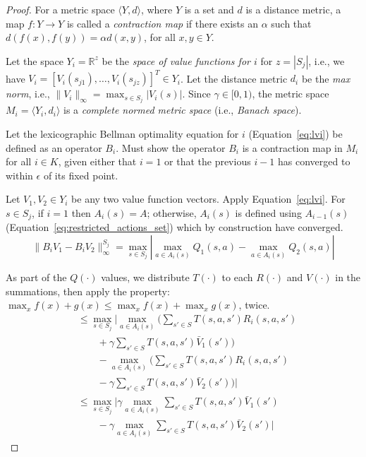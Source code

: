 \begin{proof}
For a metric space $\langle Y, d \rangle$, where $Y$ is a set and $d$ is a distance metric, a map $f : Y \rightarrow Y$ is called a \emph{contraction map} if there exists an $\alpha$ such that $d(f(x), f(y)) = \alpha d(x, y)$, for all $x, y \in Y$.

Let the space $Y_i = \mathbb{R}^z$ be the \emph{space of value functions for $i$} for $z = |S_j|$, i.e., we have $V_i = [V_i(s_{j1}), \ldots, V_i(s_{jz})]^T \in Y_i$. Let the distance metric $d_i$ be the \emph{max norm}, i.e., $\|V_i\|_\infty = \max_{s \in S_j} |V_i(s)|$. Since $\gamma \in [0, 1)$, the metric space $M_i = \langle Y_i, d_i \rangle$ is a \emph{complete normed metric space} (i.e., \emph{Banach space}). %

Let the lexicographic Bellman optimality equation for $i$ (Equation~\ref{eq:lvi}) be defined as an operator $B_i$. Must show the operator $B_i$ is a contraction map in $M_i$ for all $i \in K$, given either that $i=1$ or that the previous $i-1$ has converged to within $\epsilon$ of its fixed point.

Let $V_1, V_2 \in Y_i$ be any two value function vectors. Apply Equation~\ref{eq:lvi}. For $s \in S_j$, if $i = 1$ then $A_i(s) = A$; otherwise, $A_i(s)$ is defined using $A_{i-1}(s)$ (Equation~\ref{eq:restricted_actions_set}) which by construction have converged.
\begin{equation*}
    \| B_i V_1 - B_i V_2 \|_\infty^{S_j} = \max_{s \in S_j} | \max_{a \in A_i(s)} Q_1(s, a) - \max_{a \in A_i(s)} Q_2(s, a) |
\end{equation*}

As part of the $Q(\cdot)$ values, we distribute $T(\cdot)$ to each $R(\cdot)$ and $V(\cdot)$ in the summations, then apply the property: $\max_x f(x) + g(x) \leq \max_x f(x) + \max_x g(x)$, twice.
\begin{align*}
    &\leq \max_{s \in S_j} \Big| \max_{a \in A_i(s)} \Big( \sum_{s' \in S} T(s, a, s') R_i(s, a, s') \\
    &\quad \quad + \gamma \sum_{s' \in S} T(s, a, s') \bar{V}_1(s') \Big) \\
    &\quad \quad - \max_{a \in A_i(s)} \Big( \sum_{s' \in S} T(s, a, s') R_i(s, a, s') \\
    &\quad \quad - \gamma \sum_{s' \in S} T(s, a, s') \bar{V}_2(s') \Big) \Big| \\
    &\leq \max_{s \in S_j} \Big| \gamma \max_{a \in A_i(s)} \sum_{s' \in S} T(s, a, s') \bar{V}_1(s') \\
    &\quad \quad - \gamma \max_{a \in A_i(s)} \sum_{s' \in S} T(s, a, s') \bar{V}_2(s') \Big|
\end{align*}


\end{proof}
